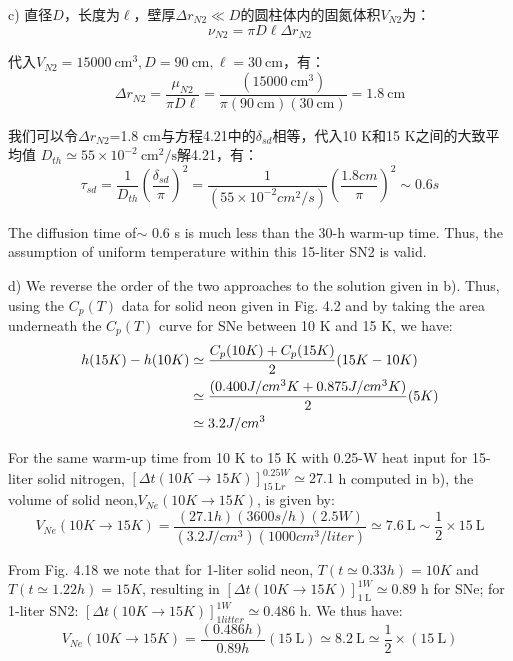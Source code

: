 c) 直径$D$，长度为$\ell$，壁厚$\Delta r_{N2}\ll D$的圆柱体内的固氮体积$V_{N2}$为：
\begin{equation*}%
\nu_{N2}=\pi D\ell\Delta r_{N2} \tag{S3.1}
\end{equation*}

代入$V_{N2}=15000\ \mathrm{cm^3},D=90\ \mathrm{cm},\ell= 30\ \mathrm{cm}$，有：
\begin{equation*}%
\Delta r_{N2}=\frac{\mu_{N2}}{\pi D\ell}=\frac{(15000\ \mathrm{cm^3})}{\pi(90\ \mathrm{cm})(30\ \mathrm{cm})}=1.8\ \mathrm{cm}
\end{equation*}

我们可以令$\Delta r_{N2}$=1.8 cm与方程4.21中的$\delta_{sd}$相等，代入10 K和15 K之间的大致平均值
$D_{th}\simeq 55\times10^{−2}\ \mathrm{cm^2/s}$解4.21，有：
\begin{equation}%
\tau_{sd}=\frac{1}{D_{th}}(\frac{\delta_{sd}}{\pi})^2
=\frac{1}{(55\times10^{-2}cm^2/s)}(\frac{1.8cm}{\pi})^2\sim 0.6 s
\end{equation}

The diffusion time of$\sim$ 0.6 s is much less than the 30-h warm-up time. Thus, the
assumption of uniform temperature within this 15-liter SN2 is valid.

d) We reverse the order of the two approaches to the solution given in b). Thus,
using the $C_p(T)$ data for solid neon given in Fig. 4.2 and by taking the area
underneath the $C_p(T)$ curve for SNe between 10 K and 15 K, we have:
\begin{align*}%
h(15K)-h(10K)&\simeq\frac{C_p(10K)+C_p(15K)}{2}(15K-10K)\\\notag
&\simeq\frac{(0.400J/cm^3K+0.875J/cm^3K)}{2}(5K)\\\notag
&\simeq 3.2J/cm^3
\end{align*}

For the same warm-up time from 10 K to 15 K with 0.25-W heat input for 15-liter
solid nitrogen, $[\Delta t(10 K\rightarrow 15 K)]_{15\ \mathrm{L}r}^{0.25 W}\simeq 27.1$ h computed in b), the volume of solid neon,$V_{Ne}(10 K\rightarrow 15 K)$, is given by:
\begin{equation*}%
V_{Ne}(10K \rightarrow 15K)=\frac{(27.1h)(3600s/h)(2.5W)}{(3.2J/cm^3)(1000cm^3/liter)}
\simeq 7.6\ \mathrm{L}\sim\frac{1}{2}\times 15\ \mathrm{L}
\end{equation*}

From Fig. 4.18 we note that for 1-liter solid neon, $T(t\simeq 0.33 h)=10 K$ and $T(t\simeq
1.22 h)=15 K$, resulting in $[\Delta t(10 K\rightarrow 15 K)]_{1\ \mathrm{L}}^{1 W}\simeq 0.89$ h for SNe; for 1-liter SN2:
$[\Delta t(10 K\rightarrow 15 K)]_{1 litter}^{1 W}\simeq 0.486$ h. We thus have:
\begin{equation*}%
V_{Ne}(10K \rightarrow 15K)=\frac{(0.486h)}{0.89h}(15\ \mathrm{L})\simeq 8.2 \ \mathrm{L}\simeq\frac{1}{2}\times(15\ \mathrm{L})
\end{equation*}

